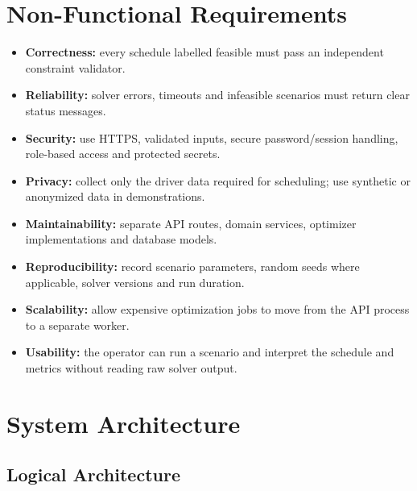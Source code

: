 \documentclass[11pt,a4paper]{article}
\begin{document}
\section{Non-Functional Requirements}

\begin{itemize}
  \item \textbf{Correctness:} every schedule labelled feasible must pass an independent constraint validator.
  \item \textbf{Reliability:} solver errors, timeouts and infeasible scenarios must return clear status messages.
  \item \textbf{Security:} use HTTPS, validated inputs, secure password/session handling, role-based access and protected secrets.
  \item \textbf{Privacy:} collect only the driver data required for scheduling; use synthetic or anonymized data in demonstrations.
  \item \textbf{Maintainability:} separate API routes, domain services, optimizer implementations and database models.
  \item \textbf{Reproducibility:} record scenario parameters, random seeds where applicable, solver versions and run duration.
  \item \textbf{Scalability:} allow expensive optimization jobs to move from the API process to a separate worker.
  \item \textbf{Usability:} the operator can run a scenario and interpret the schedule and metrics without reading raw solver output.
\end{itemize}

\section{System Architecture}

\subsection{Logical Architecture}
\end{document}
